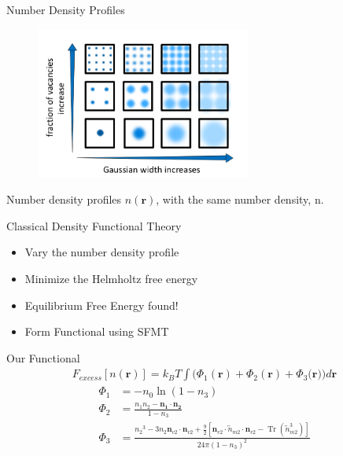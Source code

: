 \documentclass{beamer}
\renewcommand{\vec}[1]{\mathbf{#1}}
\begin{document}


\begin{frame}{Number Density Profiles}
    \begin{figure}
       \centering
       \includegraphics[height=5cm]{VaryWidthandVacancies.png}
       \label{fig:Ensemble_vary}
    \end{figure}  
    Number density profiles $n(\vec r)$, with the same number density, n.
\end{frame}

\begin{frame}{Classical Density Functional Theory}
    \begin{itemize}
       \item Vary the number density profile 
       \item Minimize the Helmholtz free energy
       \item Equilibrium Free Energy found!
       \item Form Functional using SFMT
     \end{itemize}
\end{frame}


\begin{frame}{Our Functional}
\begin{align}\label{eq:Fexfunctional}
  F_{excess}[n(\vec{r})]=k_BT\int(\Phi_1(\vec{r})+\Phi_2(\vec{r})+\Phi_3(\vec{r}{)) d}\vec{r}
\end{align}
\begin{align}
\Phi_1 &= -n_{0}\ln(1-n_{3}) \\
\Phi_2 &= \frac{n_{1}n_{2}-\vec{n_{1}}\cdot\vec{n_{2}}}{1-n_{3}} \\
\Phi_3 &= \frac{{n_2}^3-3n_2\vec{n}_{v2}\cdot\vec{n}_{v2}+\frac{9}{2}[\vec{n}_{v2}\cdot{\overleftrightarrow{n}_{m2}}\cdot{\vec{n}_{v2}}-\operatorname{Tr}({\overleftrightarrow{n}^3_{m2}})]}{24\pi(1-n_3)^2}  
\end{align} 
\end{frame}
\end{document}

